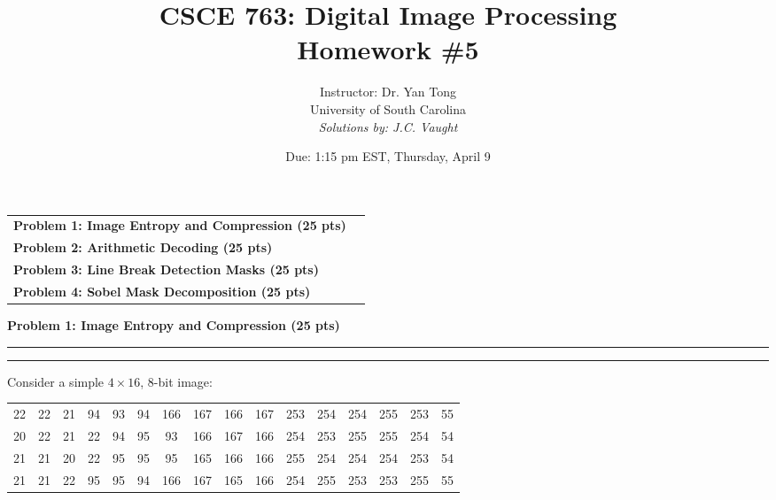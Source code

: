 \documentclass[12pt]{article}
\title{CSCE 763: Digital Image Processing \\ Homework \#5}
\author{Instructor: Dr. Yan Tong \\ University of South Carolina \\ \textit{Solutions by: J.C. Vaught}}
\date{Due: 1:15 pm EST, Thursday, April 9}
\newcommand{\question}[1]{%
  \clearpage
  \vspace{0.5cm}
  {\noindent\normalsize \textbf{#1}}
  \vspace{0.2cm}
  \hrule
  \vspace{0.1cm}
  \hrule
  \vspace{0.3cm}
}
\begin{document}
\maketitle
\setlength{\parindent}{0pt}



\begin{center}
\begin{tcolorbox}[colback=white, colframe=USC_Black90, colbacktitle=USC_Black10,
                  coltitle=USC_Black90, sharp corners, boxrule=1pt,
                  title=\Large\bfseries Table of Contents]
\begin{tabular}{p{}r}
\textbf{Problem 1: Image Entropy and Compression (25 pts)} \dotfill & \textbf{\pageref{quest:1}} \\[0.3em]
\textbf{Problem 2: Arithmetic Decoding (25 pts)} \dotfill & \textbf{\pageref{quest:2}} \\[0.3em]
\textbf{Problem 3: Line Break Detection Masks (25 pts)} \dotfill & \textbf{\pageref{quest:3}} \\[0.3em]
\textbf{Problem 4: Sobel Mask Decomposition (25 pts)} \dotfill & \textbf{\pageref{quest:4}} \\
\end{tabular}
\vspace{0.2cm}
\end{tcolorbox}
\end{center}

\vspace{0.5cm}


\question{Problem 1: Image Entropy and Compression (25 pts)}\label{quest:1}

Consider a simple $4 \times 16$, 8-bit image:

\vspace{0.3cm}

\begin{center}
\ttfamily
\begin{tabular}{cccccccccccccccc}
22 & 22 & 21 & 94 & 93 & 94 & 166 & 167 & 166 & 167 & 253 & 254 & 254 & 255 & 253 & 55 \\
20 & 22 & 21 & 22 & 94 & 95 & 93 & 166 & 167 & 166 & 254 & 253 & 255 & 255 & 254 & 54 \\
21 & 21 & 20 & 22 & 95 & 95 & 95 & 165 & 166 & 166 & 255 & 254 & 254 & 254 & 253 & 54 \\
21 & 21 & 22 & 95 & 95 & 94 & 166 & 167 & 165 & 166 & 254 & 255 & 253 & 253 & 255 & 55 \\
\end{tabular}
\end{center}
\rmfamily
\end{document}
